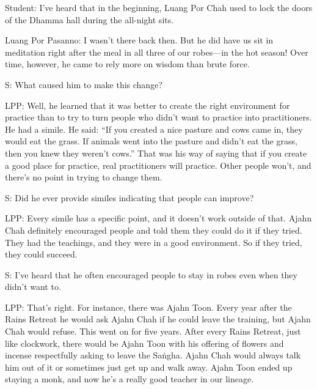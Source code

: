 
Student: I've heard that in the beginning, Luang Por Chah used to lock 
the doors of the Dhamma hall during the all-night sits.

Luang Por Pasanno: I wasn't there back then. But he did have us sit in 
meditation right after the meal in all three of our robes---in the hot 
season! Over time, however, he came to rely more on wisdom than brute 
force.

S: What caused him to make this change?

LPP: Well, he learned that it was better to create the right 
environment for practice than to try to turn people who didn't want to 
practice into practitioners. He had a simile. He said: ``If you created 
a nice pasture and cows came in, they would eat the grass. If animals 
went into the pasture and didn't eat the grass, then you knew they 
weren't cows.'' That was his way of saying that if you create a good 
place for practice, real practitioners will practice. Other people 
won't, and there's no point in trying to change them.

S: Did he ever provide similes indicating that people can improve?

LPP: Every simile has a specific point, and it doesn't work outside of 
that. Ajahn Chah definitely encouraged people and told them they could 
do it if they tried. They had the teachings, and they were in a good 
environment. So if they tried, they could succeed.

S: I've heard that he often encouraged people to stay in robes even 
when they didn't want to.

LPP: That's right. For instance, there was Ajahn Toon. Every year after 
the Rains Retreat he would ask Ajahn Chah if he could leave the 
training, but Ajahn Chah would refuse. This went on for five years. 
After every Rains Retreat, just like clockwork, there would be Ajahn 
Toon with his offering of flowers and incense respectfully asking to 
leave the Saṅgha. Ajahn Chah would always talk him out of it or 
sometimes just get up and walk away. Ajahn Toon ended up staying a 
monk, and now he's a really good teacher in our lineage.


